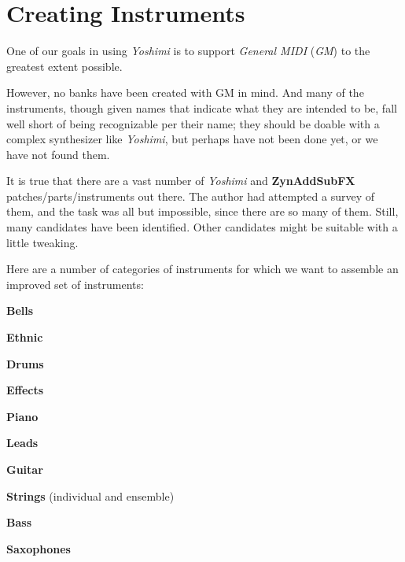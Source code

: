 %
%
%

\section{Creating Instruments}
\label{sec:cookbook_instruments}

   One of our goals in using \textsl{Yoshimi} is to support
   \textsl{General MIDI} (\textsl{GM})
   to the greatest extent possible.

   However, no banks have been created with GM in mind.  And many of the
   instruments, though given names that indicate what they are intended to
   be, fall well short of being recognizable per their name; they should be
   doable with a complex synthesizer like \textsl{Yoshimi}, but perhaps have
   not been done yet, or we have not found them.
  
   It is true that there are a vast number of \textsl{Yoshimi} and
   \textbf{ZynAddSubFX} patches/parts/instruments out there.  The author
   had attempted a survey of them, and the task was all but impossible, since
   there are so many of them.
   Still, many candidates have been identified.  Other candidates might be
   suitable with a little tweaking.

   Here are a number of categories of instruments for which we want to
   assemble an improved set of instruments:

   \begin{enumber}
      \item \textbf{Bells}
      \item \textbf{Ethnic}
      \item \textbf{Drums}
      \item \textbf{Effects}
      \item \textbf{Piano}
      \item \textbf{Leads}
      \item \textbf{Guitar}
      \item \textbf{Strings} (individual and ensemble)
      \item \textbf{Bass}
      \item \textbf{Saxophones}
   \end{enumber}

